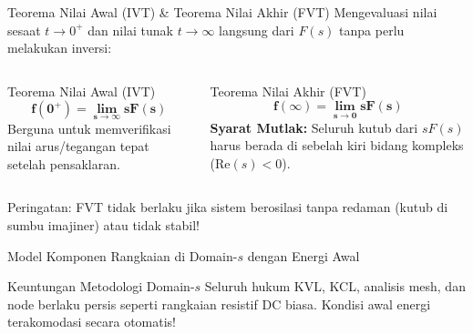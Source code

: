 \documentclass[aspectratio=169,10pt]{beamer}
\begin{document}
\begin{frame}{Teorema Nilai Awal (IVT) \& Teorema Nilai Akhir (FVT)}
  Mengevaluasi nilai sesaat $t \to 0^+$ dan nilai tunak $t \to \infty$ langsung dari $F(s)$ tanpa perlu melakukan inversi:
  \vspace{0.15cm}
  \begin{columns}[t]
    \begin{block}{Teorema Nilai Awal (IVT)}
      \begin{equation}
        \mathbf{f(0^+) = \lim_{s \to \infty} s F(s)}
      \end{equation}
      Berguna untuk memverifikasi nilai arus/tegangan tepat setelah pensaklaran.
    \end{block}

    \begin{alertblock}{Teorema Nilai Akhir (FVT)}
      \begin{equation}
        \mathbf{f(\infty) = \lim_{s \to 0} s F(s)}
      \end{equation}
      \textbf{Syarat Mutlak:} Seluruh kutub dari $sF(s)$ harus berada di sebelah kiri bidang kompleks ($\text{Re}(s) < 0$).
    \end{alertblock}
  \end{columns}
  \vspace{0.2cm}
  \footnotesize Peringatan: FVT tidak berlaku jika sistem berosilasi tanpa redaman (kutub di sumbu imajiner) atau tidak stabil!
\end{frame}

\begin{frame}{Model Komponen Rangkaian di Domain-$s$ dengan Energi Awal}
  \begin{center}
  \end{center}
  \vspace{0.2cm}
  \begin{block}{Keuntungan Metodologi Domain-$s$}
    Seluruh hukum KVL, KCL, analisis mesh, dan node berlaku persis seperti rangkaian resistif DC biasa. Kondisi awal energi terakomodasi secara otomatis!
  \end{block}
\end{frame}
\end{document}

